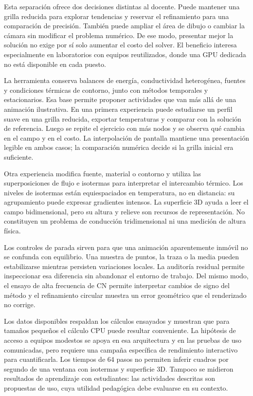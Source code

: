 \documentclass[11pt,a4paper]{article}
\begin{document}
Esta separación ofrece dos decisiones distintas al docente. Puede mantener una grilla reducida para explorar tendencias y reservar el refinamiento para una comparación de precisión. También puede ampliar el área de dibujo o cambiar la cámara sin modificar el problema numérico. De ese modo, presentar mejor la solución no exige por sí solo aumentar el costo del solver. El beneficio interesa especialmente en laboratorios con equipos reutilizados, donde una GPU dedicada no está disponible en cada puesto.

La herramienta conserva balances de energía, conductividad heterogénea, fuentes y condiciones térmicas de contorno, junto con métodos temporales y estacionarios. Esa base permite proponer actividades que van más allá de una animación ilustrativa. En una primera experiencia puede estudiarse un perfil suave en una grilla reducida, exportar temperaturas y comparar con la solución de referencia. Luego se repite el ejercicio con más nodos y se observa qué cambia en el campo y en el costo. La interpolación de pantalla mantiene una presentación legible en ambos casos; la comparación numérica decide si la grilla inicial era suficiente.

Otra experiencia modifica fuente, material o contorno y utiliza las superposiciones de flujo e isotermas para interpretar el intercambio térmico. Los niveles de isotermas están equiespaciados en temperatura, no en distancia: su agrupamiento puede expresar gradientes intensos. La superficie 3D ayuda a leer el campo bidimensional, pero su altura y relieve son recursos de representación. No constituyen un problema de conducción tridimensional ni una medición de altura física.

Los controles de parada sirven para que una animación aparentemente inmóvil no se confunda con equilibrio. Una muestra de puntos, la traza o la media pueden estabilizarse mientras persisten variaciones locales. La auditoría residual permite inspeccionar esa diferencia sin abandonar el entorno de trabajo. Del mismo modo, el ensayo de alta frecuencia de CN permite interpretar cambios de signo del método y el refinamiento circular muestra un error geométrico que el renderizado no corrige.

Los datos disponibles respaldan los cálculos ensayados y muestran que para tamaños pequeños el cálculo CPU puede resultar conveniente. La hipótesis de acceso a equipos modestos se apoya en esa arquitectura y en las pruebas de uso comunicadas, pero requiere una campaña específica de rendimiento interactivo para cuantificarla. Los tiempos de 64 pasos no permiten inferir cuadros por segundo de una ventana con isotermas y superficie 3D. Tampoco se midieron resultados de aprendizaje con estudiantes: las actividades descritas son propuestas de uso, cuya utilidad pedagógica debe evaluarse en su contexto.
\end{document}

